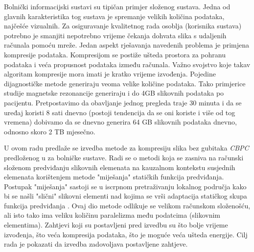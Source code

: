 \documentclass[times, utf8, zavrsni, numeric, sort]{fer}
\begin{document}
Bolnički informacijski sustavi su tipičan primjer složenog sustava. Jedna od glavnih karakteristika tog sustava je spremanje velikih količina podataka, najčešće vizualnih. Za osiguravanje kvalitetnog rada osoblja (korisnika sustava) potrebno je smanjiti nepotrebno vrijeme čekanja dohvata slika s udaljenih računala pomoću mreže. Jedan aspekt rješavanja navedenih problema je primjena kompresije podataka. Kompresijom se postiže ušteda prostora za pohranu podataka i veća propusnost podataka između računala. Važno svojstvo koje takav algoritam kompresije mora imati je kratko vrijeme izvođenja. Pojedine dijagnostičke metode generiraju veoma velike količine podataka. Tako primjerice studije magnetske rezonancije generiraju i do 4GB slikovnih podataka po pacijentu. Pretpostavimo da obavljanje jednog pregleda traje 30 minuta i da se uređaj koristi 8 sati dnevno (postoji tendencija da se oni koriste i više od tog vremena) dobivamo da se dnevno generira 64 GB slikovnih podataka dnevno, odnosno skoro 2 TB mjesečno.

U ovom radu predlaže se izvedba metode za kompresiju slika bez gubitaka \emph{CBPC}  predloženog u \cite{Knezovic:06, Knezovic:07, Knezovic:007}  za bolničke sustave. Radi se o metodi koja se zasniva na računski složenom predviđanju slikovnih elemenata na kauzalnom kontekstu susjednih elemenata korištenjem metode "miješanja" statičkih funkcija predviđanja. Postupak "miješanja" sastoji se u iscrpnom pretraživanju lokalnog područja kako bi se našli "slični" slikovni elementi nad kojima se vrši adaptacija statičkog skupa funkcija predviđanja \cite{Knezovic:07}. Ovaj dio metode odlikuje se velikom računskom složenošću, ali isto tako ima veliku količinu paralelizma među podatcima (slikovnim elementima).  Zahtjevi koji su postavljeni pred izvedbu su što bolje vrijeme izvođenja, što veća kompresija podataka, što je moguće veća ušteda energije. Cilj rada je pokazati da izvedba zadovoljava postavljene zahtjeve.
\end{document}
